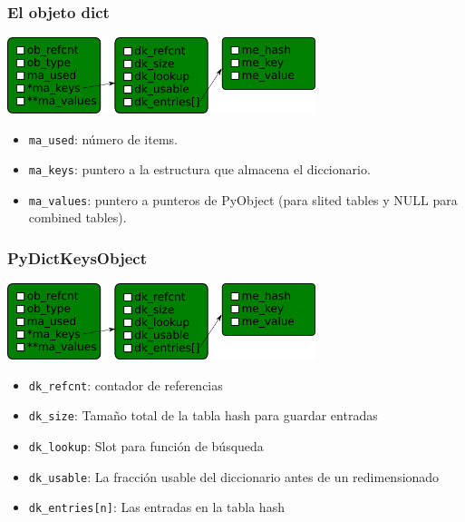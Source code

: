 \documentclass[10pt]{beamer}
\begin{document}
  \begin{frame}[containsverbatim]
    \frametitle{El objeto dict}
    \begin{center}\includegraphics[width=9cm]{img/Dict.png}\end{center}
    \begin{itemize}
      \item \verb+ma_used+: número de items.
      \item \verb+ma_keys+: puntero a la estructura que almacena el diccionario.
      \item \verb+ma_values+: puntero a punteros de PyObject (para slited tables y NULL para combined tables).
    \end{itemize}
  \end{frame}

  \begin{frame}[containsverbatim]
    \frametitle{PyDictKeysObject}
    \begin{center}\includegraphics[width=9cm]{img/Dict.png}\end{center}
    \begin{itemize}
      \item \verb+dk_refcnt+: contador de referencias
      \item \verb+dk_size+: Tamaño total de la tabla hash para guardar entradas
      \item \verb+dk_lookup+: Slot para función de búsqueda
      \item \verb+dk_usable+: La fracción usable del diccionario antes de un redimensionado
      \item \verb+dk_entries[n]+: Las entradas en la tabla hash
    \end{itemize}
  \end{frame}
\end{document}
